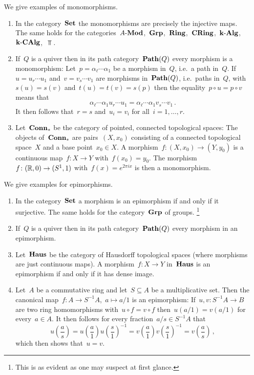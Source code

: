 \begin{example}
  We give examples of monomorphisms.
  \begin{enumerate}
    \item
      In the category~$\mathbf{Set}$ the monomorphisms are precisely the injective maps.
      The same holds for the categories~$\text{$A$-$\mathbf{Mod}$}$,~$\mathbf{Grp}$,~$\mathbf{Ring}$,~$\mathbf{CRing}$,~$\text{$\mathbf{k}$-$\mathbf{Alg}$}$,~$\text{$\mathbf{k}$-$\mathbf{CAlg}$}$,~$\Top$.
    \item
      If~$Q$ is a quiver then in its path category~$\mathbf{Path}(Q)$ every morphism is a monomorphism:
      Let~$p = \alpha_\ell \dotsm \alpha_1$ be a morphism in~$Q$, i.e.\ a path in~$Q$.
      If~$u = u_r \dotsm u_1$ and~$v = v_s \dotsm v_1$ are morphisms in~$\mathbf{Path}(Q)$, i.e.\ paths in~$Q$, with~$s(u) = s(v)$ and~$t(u) = t(v) = s(p)$ then the equality~$p \circ u = p \circ v$ means that
      \[
          \alpha_\ell \dotsm \alpha_1 u_r \dotsm u_1
        = \alpha_\ell \dotsm \alpha_1 v_s \dotsm v_1 \,.
      \]
      It then follows that~$r = s$ and~$u_i = v_i$ for all~$i = 1, \dotsc, r$.
    \item
      Let~$\mathbf{Conn}_*$ be the category of pointed, connected topological spaces:
      The objects of~$\mathbf{Conn}_*$ are pairs~$(X, x_0)$ consisting of a connected topological space~$X$ and a base point~$x_0 \in X$.
      A morphism~$f \colon (X, x_0) \to (Y, y_0)$ is a continuous map~$f \colon X \to Y$ with~$f(x_0) = y_0$.
      The morphism~$f \colon (\mathbb{R}, 0) \to (S^1, 1)$ with~$f(x) = e^{2 \pi i x}$ is then a monomorphism.
  \end{enumerate}
\end{example}


\begin{example}
  We give examples for epimorphisms.
  \begin{enumerate}
    \item
      In the category~$\mathbf{Set}$ a morphism is an epimorphism if and only if it surjective.
      The same holds for the category~$\mathbf{Grp}$ of groups.%
      \footnote{This is as evident as one may suspect at first glance.}
    \item
      If~$Q$ is a quiver then in its path category~$\mathbf{Path}(Q)$ every morphism in an epimorphism.
    \item
      Let~$\mathbf{Haus}$ be the category of Hausdorff topological spaces (where morphisms are just continuous maps).
      A morphism~$f \colon X \to Y$ in~$\mathbf{Haus}$ is an epimorphism if and only if it has dense image.
    \item
      Let~$A$ be a commutative ring and let~$S \subseteq A$ be a multiplicative set.
      Then the canonical map~$f \colon A \to S^{-1} A$,~$a \mapsto a/1$ is an epimorphism:
      If~$u,v \colon S^{-1} A \to B$ are two ring homomorphisms with~$u \circ f = v \circ f$ then~$u(a/1) = v(a/1)$ for every~$a \in A$.
      It then follows for every fraction~$a/s \in S^{-1} A$ that
      \[
          u\left( \frac{a}{s} \right)
        = u\left( \frac{a}{1} \right) u\left( \frac{s}{1} \right)^{-1}
        = v\left( \frac{a}{1} \right) v\left( \frac{s}{1} \right)^{-1}
        = v\left( \frac{a}{s} \right) \,,
      \]
      which then shows that~$u = v$.
  \end{enumerate}
\end{example}


